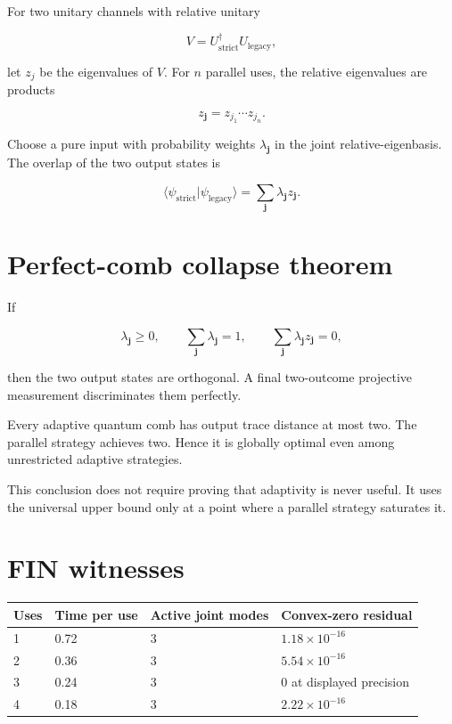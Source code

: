 \documentclass[11pt,a4paper,openany]{report}
\begin{document}
For two unitary channels with relative unitary

\[
V=U_{\mathrm{strict}}^\dagger U_{\mathrm{legacy}},
\]

let \(z_j\) be the eigenvalues of \(V\). For \(n\) parallel uses, the relative eigenvalues are products

\[
z_{\mathbf j}=z_{j_1}\cdots z_{j_n}.
\]

Choose a pure input with probability weights \(\lambda_{\mathbf j}\) in the joint relative-eigenbasis. The overlap of the two output states is

\[
\langle\psi_{\mathrm{strict}}|
\psi_{\mathrm{legacy}}\rangle
=
\sum_{\mathbf j}\lambda_{\mathbf j}z_{\mathbf j}.
\]

\section{Perfect-comb collapse theorem}

If

\[
\lambda_{\mathbf j}\geq0,\qquad
\sum_{\mathbf j}\lambda_{\mathbf j}=1,\qquad
\sum_{\mathbf j}\lambda_{\mathbf j}z_{\mathbf j}=0,
\]

then the two output states are orthogonal. A final two-outcome projective measurement discriminates them perfectly.

Every adaptive quantum comb has output trace distance at most two. The parallel strategy achieves two. Hence it is globally optimal even among unrestricted adaptive strategies.

This conclusion does not require proving that adaptivity is never useful. It uses the universal upper bound only at a point where a parallel strategy saturates it.

\section{FIN witnesses}

\begin{center}
\begingroup\small
\setlength{\tabcolsep}{2.5pt}
\renewcommand{\arraystretch}{1.16}
\begin{longtable}{@{}p{}p{}p{}p{}@{}}
\toprule
\textbf{Uses} & \textbf{Time per use} & \textbf{Active joint modes} & \textbf{Convex-zero residual} \\
\midrule
\endhead
1 & 0.72 & 3 & \(1.18\times10^{-16}\) \\
2 & 0.36 & 3 & \(5.54\times10^{-16}\) \\
3 & 0.24 & 3 & \(0\) at displayed precision \\
4 & 0.18 & 3 & \(2.22\times10^{-16}\) \\
\bottomrule
\end{longtable}
\endgroup
\end{center}
\end{document}
